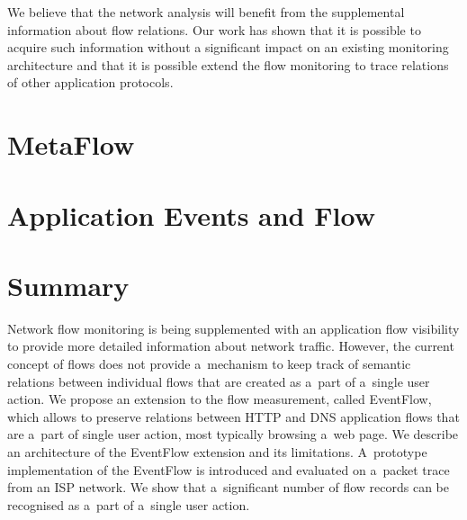 We believe that the network analysis will benefit from the supplemental information about flow relations. Our work has shown that it is possible to acquire such information without a significant impact on an existing monitoring architecture and that it is possible extend the flow monitoring to trace relations of other application protocols.







\section{MetaFlow}\label{sec:metaflow}

\section{Application Events and Flow}\label{sec:app-events}



\section{Summary}\label{sec:ng-summary}

Network flow monitoring is being supplemented with an application flow visibility to provide more detailed information about network traffic. However, the current concept of flows does not provide a~mechanism to keep track of semantic relations between individual flows that are created as a~part of a~single user action. We propose an extension to the flow measurement, called EventFlow, which allows to preserve relations between HTTP and DNS application flows that are a~part of single user action, most typically browsing a~web page. We describe an architecture of the EventFlow extension and its limitations. A~prototype implementation of the EventFlow is introduced and evaluated on a~packet trace from an ISP network. We show that a~significant number of flow records can be recognised as a~part of a~single user action.